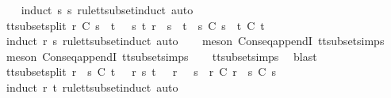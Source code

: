 %
\isadelimproof
\ \ %
\endisadelimproof
%
\isatagproof
{}\isamarkupfalse%
\ {\isacharparenleft}induct\ s{\isacharprime}\ s\ rule{\isacharcolon}tt{\isacharunderscore}subset{\isachardot}induct{\isacharcomma}\ auto{\isacharparenright}%
\endisatagproof
{\isafoldproof}%
%
\isadelimproof
\ \ \ \isanewline
%
\endisadelimproof
\isanewline
{}\isamarkupfalse%
\ tt{\isacharunderscore}subset{\isacharunderscore}split{\isacharcolon}\ {\isachardoublequoteopen}r\ {\isasymsubseteq}\isactrlsub C\ s\ {\isacharat}\ t\ {\isasymLongrightarrow}\ {\isasymexists}\ s{\isacharprime}\ t{\isacharprime}{\isachardot}\ r\ {\isacharequal}\ s{\isacharprime}\ {\isacharat}\ t{\isacharprime}\ {\isasymand}\ s{\isacharprime}\ {\isasymsubseteq}\isactrlsub C\ s\ {\isasymand}\ t{\isacharprime}\ {\isasymsubseteq}\isactrlsub C\ t{\isachardoublequoteclose}\isanewline
%
\isadelimproof
\ \ %
\endisadelimproof
%
\isatagproof
{}\isamarkupfalse%
\ {\isacharparenleft}induct\ r\ s\ rule{\isacharcolon}tt{\isacharunderscore}subset{\isachardot}induct{\isacharcomma}\ auto{\isacharparenright}\isanewline
\ \ \isamarkupfalse%
\ {\isacharparenleft}meson\ Cons{\isacharunderscore}eq{\isacharunderscore}appendI\ tt{\isacharunderscore}subset{\isachardot}simps{\isacharparenleft}{}{\isacharparenright}{\isacharparenright}\isanewline
\ \ \isamarkupfalse%
\ {\isacharparenleft}meson\ Cons{\isacharunderscore}eq{\isacharunderscore}appendI\ tt{\isacharunderscore}subset{\isachardot}simps{\isacharparenleft}{}{\isacharparenright}{\isacharparenright}\isanewline
\ \ \isamarkupfalse%
\ tt{\isacharunderscore}subset{\isachardot}simps{\isacharparenleft}{}{\isacharparenright}\ \isamarkupfalse%
\ blast{\isacharplus}%
\endisatagproof
{\isafoldproof}%
%
\isadelimproof
\isanewline
%
\endisadelimproof
\isanewline
{}\isamarkupfalse%
\ tt{\isacharunderscore}subset{\isacharunderscore}split{}{\isacharcolon}\ {\isachardoublequoteopen}r\ {\isacharat}\ s\ {\isasymsubseteq}\isactrlsub C\ t\ {\isasymLongrightarrow}\ {\isasymexists}\ r{\isacharprime}\ s{\isacharprime}{\isachardot}\ t\ {\isacharequal}\ \ r{\isacharprime}\ {\isacharat}\ \ s{\isacharprime}\ {\isasymand}\ r\ {\isasymsubseteq}\isactrlsub C\ r{\isacharprime}\ {\isasymand}\ s\ {\isasymsubseteq}\isactrlsub C\ s{\isacharprime}{\isachardoublequoteclose}\isanewline
%
\isadelimproof
\ \ %
\endisadelimproof
%
\isatagproof
{}\isamarkupfalse%
\ {\isacharparenleft}induct\ r\ t\ rule{\isacharcolon}tt{\isacharunderscore}subset{\isachardot}induct{\isacharcomma}\ auto{\isacharparenright}\isanewline
